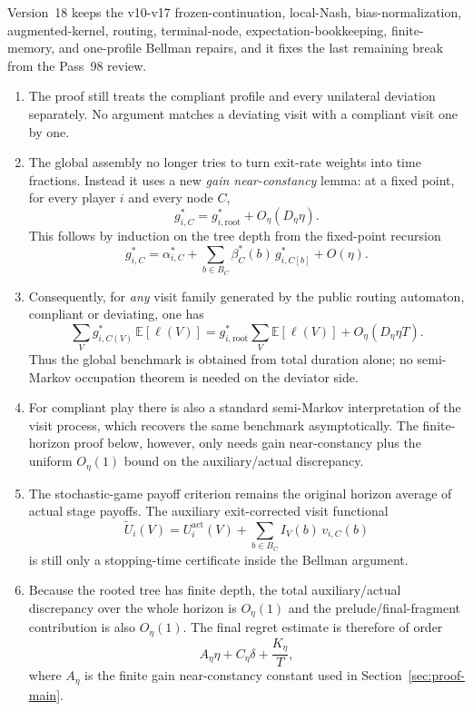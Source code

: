 \documentclass[12pt]{article}
\theoremstyle{definition}
\newcommand{\E}{\mathbb{E}}
\newcommand{\1}{\mathbf{1}}
\begin{document}
Version~18 keeps the v10-v17 frozen-continuation, local-Nash,
bias-normalization, augmented-kernel, routing, terminal-node,
expectation-bookkeeping, finite-memory, and one-profile Bellman repairs, and it
fixes the last remaining break from the Pass~98 review.

\begin{enumerate}[label=\textnormal{(\arabic*)},leftmargin=2.4em]
\item The proof still treats the compliant profile and every unilateral
deviation separately. No argument matches a deviating visit with a compliant
visit one by one.
\item The global assembly no longer tries to turn exit-rate weights into time
fractions. Instead it uses a new \emph{gain near-constancy} lemma: at a fixed
point, for every player $i$ and every node $C$,
\[
g_{i,C}^*=g_{i,\mathrm{root}}^*+O_\eta(D_\eta\eta).
\]
This follows by induction on the tree depth from the fixed-point recursion
\[
g_{i,C}^*
=
\alpha_{i,C}^*
+
\sum_{b\in B_C}\beta_C^*(b)\,g_{i,C[b]}^*
+
O(\eta).
\]
\item Consequently, for \emph{any} visit family generated by the public routing
automaton, compliant or deviating, one has
\[
\sum_V g_{i,C(V)}^*\,\E[\ell(V)]
=
g_{i,\mathrm{root}}^*\sum_V \E[\ell(V)]
+
O_\eta(D_\eta\eta T).
\]
Thus the global benchmark is obtained from total duration alone; no semi-Markov
occupation theorem is needed on the deviator side.
\item For compliant play there is also a standard semi-Markov interpretation of
the visit process, which recovers the same benchmark asymptotically. The
finite-horizon proof below, however, only needs gain near-constancy plus the
uniform $O_\eta(1)$ bound on the auxiliary/actual discrepancy.
\item The stochastic-game payoff criterion remains the original horizon average
of actual stage payoffs. The auxiliary exit-corrected visit functional
\[
\widetilde U_i(V)=U_i^{\mathrm{act}}(V)+\sum_{b\in B_C} I_V(b)\,v_{i,C}(b)
\]
is still only a stopping-time certificate inside the Bellman argument.
\item Because the rooted tree has finite depth, the total auxiliary/actual
discrepancy over the whole horizon is $O_\eta(1)$ and the prelude/final-fragment
contribution is also $O_\eta(1)$. The final regret estimate is therefore of
order
\[
A_\eta\eta + C_\eta\delta + \frac{K_\eta}{T},
\]
where $A_\eta$ is the finite gain near-constancy constant used in
Section~\ref{sec:proof-main}.
\end{enumerate}
\end{document}
